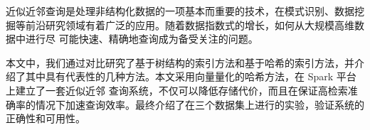
 

\makeatletter
\ifthu@bachelor\relax\else
  \ifthu@doctor
  \else
    \ifthu@master
    \fi
  \fi
\fi
\makeatother







\begin{cabstract}
  近似近邻查询是处理非结构化数据的一项基本而重要的技术，在模式识别、数据挖掘等前沿研究领域有着广泛的应用。随着数据指数式的增长，如何从大规模高维数据中进行尽
  可能快速、精确地查询成为备受关注的问题。

  本文中，我们通过对比研究了基于树结构的索引方法和基于哈希的索引方法，并介绍了其中具有代表性的几种方法。本文采用向量量化的哈希方法，在 Spark 平台上建立了一套近似近邻
  查询系统，不仅可以降低存储代价，而且在保证高检索准确率的情况下加速查询效率。最终介绍了在三个数据集上进行的实验，验证系统的正确性和可用性。
\end{cabstract}


